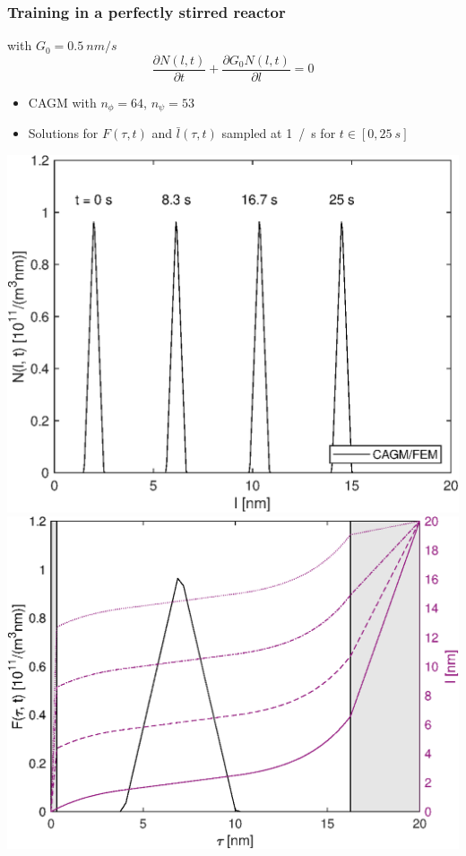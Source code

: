 \documentclass[10pt,xcolor=dvipsnames]{beamer}
\newcommand*{\itemskip}{0.25\baselineskip}
\begin{document}

\begin{frame}[t]
  
  \frametitle{Training in a perfectly stirred reactor}
  
   with $G_0 = \SI{0.5}{nm/s}$
  \begin{equation*}
    \frac{\partial N(l, t)}{\partial t} + \frac{\partial G_0 N(l, t)}{\partial l} = 0
  \end{equation*}
  
  \begin{itemize}
  \vspace{\itemskip}
  \item CAGM with $n_{\phi} = 64$, $n_{\psi} = 53$
  \vspace{\itemskip}
  \item Solutions for $F(\tau, t)$ and $\bar{l}(\tau, t)$ sampled at \SI{1}{/s} for $t \in [0, \SI{25}{s}]$
  \vspace{\itemskip}
  \end{itemize}

  \includegraphics[height=0.38\columnwidth,clip]{fig/pbe_pod_hat.eps}\hfill
  \includegraphics[height=0.38\columnwidth,clip]{fig/pbe_pod_psr_fl.eps}\\
  
\end{frame}
\end{document}
